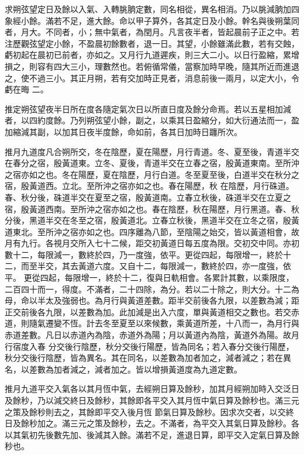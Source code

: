 \begin{pinyinscope}
 求朔弦望定日及餘以入氣、入轉朓朒定數，同名相從，異名相消。乃以朓減朒加四象經小餘。滿若不足，進大餘。命以甲子算外，各其定日及小餘。幹名與後朔葉同者，月大。不同者，小；無中氣者，為閏月。凡言夜半者，皆起晨前子正之中。若注歷觀弦望定小餘，不盈晨初餘數者，退一日。其望，小餘雖滿此數，若有交蝕，虧初起在晨初已前者，亦如之。又月行九道遲疾，則三大二小。以日行盈縮，累增損之，則容有四大三小，理數然也。若俯循常儀，當察加時早晚，隨其所近而進退之，使不過三小。其正月朔，若有交加時正見者，消息前後一兩月，以定大小，令虧在晦
 二。



 推定朔弦望夜半日所在度各隨定氣次日以所直日度及餘分命焉。若以五星相加減者，以四約度餘。乃列朔弦望小餘，副之，以乘其日盈縮分，如大衍通法而一，盈加縮減其副，以加其日夜半度餘，命如前，各其日加時日躔所次。



 推月九道度凡合朔所交，冬在陰歷，夏在陽歷，月行青道。冬、夏至後，青道半交在春分之宿，殷黃道東。立冬、夏後，青道半交在立春之宿，殷黃道東南。至所沖之宿亦如之也。冬在陽歷，夏在陰歷，月行白道。冬至夏至後，白道半交在秋分之宿，殷黃道西。立北。至所沖之宿亦如之也。春在陽歷，秋
 在陰歷，月行硃道。春、秋分後，硃道半交在夏至之宿，殷黃道南。立春立秋後，硃道半交在立夏之宿，殷黃道西南。至所沖之宿亦如之也。春在陰歷，秋在陽歷，月行黑道。春、秋分後，黑道半交在冬至之宿，殷黃道北。立春立秋後，黑道半交在立冬之宿，殷黃道東北。至所沖之宿亦如之也。四序離為八節，至陰陽之始交，皆以黃道相會，故月有九行。各視月交所入七十二候，距交初黃道日每五度為限。交初交中同。亦初數十二，每限減一，數終於四，乃一度強，依平。更從四起，每限增一，終於十二，而至半交，其去黃道六度。又自十二，每限減一，數終於四，亦一度強，依平。
 更從四起，每限增一，終於十二，復與日軌相會。各累計其數，以乘限度，二百四十而一，得度。不滿者，二十四除，為分。若以二十除之，則大分。十二為母，命以半太及強弱也。為月行與黃道差數。距半交前後各九限，以差數為減；距正交前後各九限，以差數為加。此加減是出入六度，單與黃道相交之數也。若交赤道，則隨氣遷變不恆。計去冬至夏至以來候數，乘黃道所差，十八而一，為月行與赤道差數。凡日以赤道內為陰，赤道外為陽；月以黃道內為陰，黃道外為陽。故月行宿度入春
 分交後行陰歷，秋分交後行陽歷，皆為同名；若入春分交後行陽歷，秋分交後行陰歷，皆為異名。其在同名，以差數為加者加之，減者減之；若在異名，以差數為加者減之，減者加之。皆以增損黃道度為九道定數。



 推月九道平交入氣各以其月恆中氣，去經朔日算及餘秒，加其月經朔加時入交泛日及餘秒，乃以減交終日及餘秒，其餘即各平交入其月恆中氣日算及餘秒也。滿三元之策及餘秒則去之，其餘即平交入後月恆
 節氣日算及餘秒。因求次交者，以交終日及餘秒加之。滿三元之策及餘秒，去之。不滿者，為平交入其氣日算及餘秒。各以其氣初先後數先加、後減其入餘。滿若不足，進退日算，即平交入定氣日算及餘秒也。




\end{pinyinscope}
